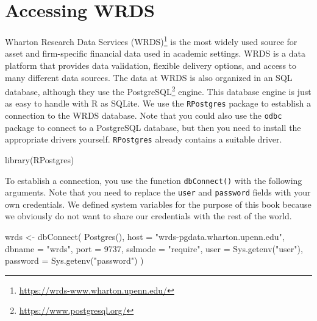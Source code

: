 \documentclass[
]{krantz}
\newenvironment{Shaded}{\begin{snugshade}}{\end{snugshade}}
\newcommand{\AttributeTok}[1]{\textcolor[rgb]{0.61,0.61,0.61}{#1}}
\newcommand{\DecValTok}[1]{\textcolor[rgb]{0.06,0.06,0.06}{#1}}
\newcommand{\FunctionTok}[1]{\textcolor[rgb]{0,0,0}{#1}}
\newcommand{\NormalTok}[1]{#1}
\newcommand{\OtherTok}[1]{\textcolor[rgb]{0.37,0.37,0.37}{#1}}
\newcommand{\StringTok}[1]{\textcolor[rgb]{0.5,0.5,0.5}{#1}}
\renewcommand{\href}[2]{#2\footnote{\url{#1}}}
\begin{document}
\hypertarget{accessing-wrds}{%
\section{Accessing WRDS}\label{accessing-wrds}}

\href{https://wrds-www.wharton.upenn.edu/}{Wharton Research Data Services (WRDS)} is the most widely used source for asset and firm-specific financial data used in academic settings. WRDS is a data platform that provides data validation, flexible delivery options, and access to many different data sources. The data at WRDS is also organized in an SQL database, although they use the \href{https://www.postgresql.org/}{PostgreSQL} engine. This database engine is just as easy to handle with R as SQLite. We use the \texttt{RPostgres} package to establish a connection to the WRDS database. Note that you could also use the \texttt{odbc} package to connect to a PostgreSQL database, but then you need to install the appropriate drivers yourself. \texttt{RPostgres} already contains a suitable driver.

\begin{Shaded}
\begin{Highlighting}[]
\FunctionTok{library}\NormalTok{(RPostgres)}
\end{Highlighting}
\end{Shaded}

To establish a connection, you use the function \texttt{dbConnect()} with the following arguments. Note that you need to replace the \texttt{user} and \texttt{password} fields with your own credentials. We defined system variables for the purpose of this book because we obviously do not want to share our credentials with the rest of the world.

\begin{Shaded}
\begin{Highlighting}[]
\NormalTok{wrds }\OtherTok{\textless{}{-}} \FunctionTok{dbConnect}\NormalTok{(}
  \FunctionTok{Postgres}\NormalTok{(),}
  \AttributeTok{host =} \StringTok{"wrds{-}pgdata.wharton.upenn.edu"}\NormalTok{,}
  \AttributeTok{dbname =} \StringTok{"wrds"}\NormalTok{,}
  \AttributeTok{port =} \DecValTok{9737}\NormalTok{,}
  \AttributeTok{sslmode =} \StringTok{"require"}\NormalTok{,}
  \AttributeTok{user =} \FunctionTok{Sys.getenv}\NormalTok{(}\StringTok{"user"}\NormalTok{),}
  \AttributeTok{password =} \FunctionTok{Sys.getenv}\NormalTok{(}\StringTok{"password"}\NormalTok{)}
\NormalTok{)}
\end{Highlighting}
\end{Shaded}
\end{document}
